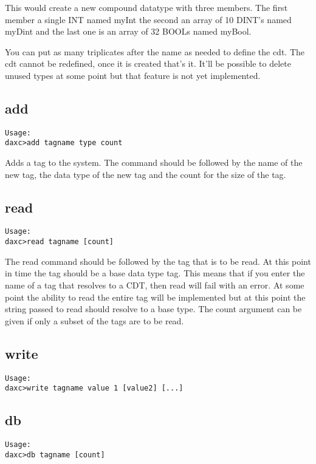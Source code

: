 \documentclass[10pt,letterpaper]{report}
\begin{document}
This would create a new compound datatype with three members.  The first member a single INT named myInt the second an array of 10 DINT's named myDint and the last one is an array of 32 BOOLs named myBool.

You can put as many triplicates after the name as needed to define the cdt.  The cdt cannot be redefined, once it is created that's it.  It'll be possible to delete unused types at some point but that feature is not yet implemented.

\subsection{add}
\begin{verbatim}
Usage:
daxc>add tagname type count
\end{verbatim}

Adds a tag to the system.  The command should be followed by the name of the new tag, the data type of the new tag and the count for the size of the tag.

\subsection{read}
\begin{verbatim}
Usage:
daxc>read tagname [count]
\end{verbatim}

The read command should be followed by the tag that is to be read.  At this point in time the tag should be a base data type tag.  This means that if you enter the name of a tag that resolves to a CDT, then read will fail with an error.  At some point the ability to read the entire tag will be implemented but at this point the string passed to read should resolve to a base type.  The count argument can be given if only a subset of the tags are to be read.

\subsection{write}
\begin{verbatim}
Usage:
daxc>write tagname value 1 [value2] [...]
\end{verbatim}

\subsection{db}
\begin{verbatim}
Usage:
daxc>db tagname [count]
\end{verbatim}
\end{document}

